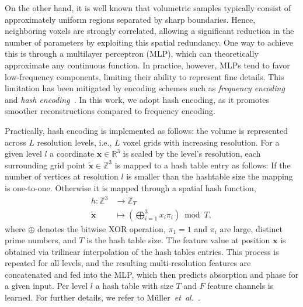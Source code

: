 \documentclass{article}
\begin{document}
On the other hand, it is well known that volumetric samples typically consist of approximately uniform regions separated by sharp boundaries.  
Hence, neighboring voxels are strongly correlated, allowing a significant reduction in the number of parameters by exploiting this spatial redundancy.  
One way to achieve this is through a multilayer perceptron (MLP), which can theoretically approximate any continuous function.  
In practice, however, MLPs tend to favor low-frequency components, limiting their ability to represent fine details.  
This limitation has been mitigated by encoding schemes such as \emph{frequency encoding} and \emph{hash encoding}~\cite{mullerInstantNeuralGraphics2022,mildenhallNeRFRepresentingScenes2020a}.  
In this work, we adopt hash encoding, as it promotes smoother reconstructions compared to frequency encoding.  

Practically, hash encoding is implemented as follows:  
the volume is represented across $L$ resolution levels, i.e., $L$ voxel grids with increasing resolution.  
For a given level $l$ a coordinate $\mathbf{x} \in \mathbb{R}^{3}$ is scaled by the level's resolution, each surrounding grid point $\tilde{\mathbf{x}} \in \mathbb{Z}^{3}$ is mapped to a hash table entry as follows:
If the number of vertices at resolution $l$ is smaller than the hashtable size the mapping is one-to-one.
Otherwise it is mapped through a spatial hash function,
\begin{equation}
\begin{split}
h : \mathbb{Z}^{3} &\rightarrow \mathbb{Z}_{T} \\
\tilde{\mathbf{x}} &\mapsto \left( \bigoplus_{i=1}^{3} x_{i} \pi_{i} \right) \bmod T,
\end{split}
\end{equation}
where $\oplus$ denotes the bitwise XOR operation, $\pi_{1}=1$ and $\pi_{i}$ are large, distinct prime numbers, and $T$ is the hash table size.  
The feature value at position $\mathbf{x}$ is obtained via trilinear interpolation of the hash tables entries.  
This process is repeated for all levels, and the resulting multi-resolution features are concatenated and fed into the MLP, which then predicts absorption and phase for a given input.
Per level $l$ a hash table with size $T$ and $F$ feature channels is learned.  
For further details, we refer to Müller~\textit{et~al.}~\cite{mullerInstantNeuralGraphics2022}.  
\end{document}
